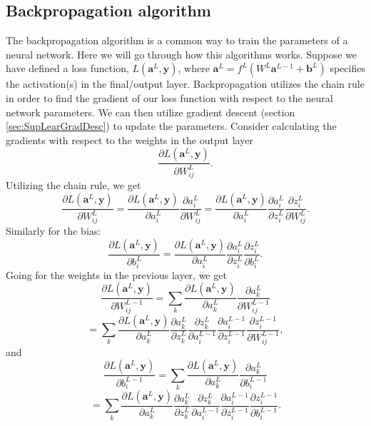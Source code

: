 \subsection{Backpropagation algorithm}
\label{subsec:BackPropagation}

The backpropagation algorithm \cite{backprop} is a common way to train the parameters of a neural network. Here we will go through how this algorithms works. Suppose we have defined a loss function, $L(\boldsymbol{a}^L,\boldsymbol{y})$, where $\boldsymbol{a}^L=f^L(W^L \boldsymbol{a}^{L-1} + \boldsymbol{b}^L)$ specifies the activation(s) in the final/output layer. Backpropagation utilizes the chain rule in order to find the gradient of our loss function with respect to the neural network parameters. We can then utilize gradient descent (section \ref{sec:SupLearGradDesc}) to update the parameters. Consider calculating the gradients with respect to the weights in the output layer
$$ 
\frac{\partial L(\boldsymbol{a}^L,\boldsymbol{y})}{\partial W^{L}_{ij}}.
$$
Utilizing the chain rule, we get
$$ 
\frac{\partial L(\boldsymbol{a}^L,\boldsymbol{y})}{\partial W^{L}_{ij}} = \frac{\partial L(\boldsymbol{a}^L,\boldsymbol{y})}{\partial a^L_i}\frac{\partial a_i^L }{\partial W^{L}_{ij}} = \frac{\partial L(\boldsymbol{a}^L,\boldsymbol{y})}{\partial a^L_i}\frac{\partial a^L_i}{\partial z^L_i}\frac{\partial z_i^L}{\partial W^L_{ij}}.
$$
Similarly for the bias:
$$
\frac{\partial L(\boldsymbol{a}^L,\boldsymbol{y})}{\partial b^L_i}  = \frac{\partial L(\boldsymbol{a}^L,\boldsymbol{y})}{\partial a^L_i}\frac{\partial a^L_i}{\partial z^L_i}\frac{\partial z_i^L}{\partial b^L_{i}}.
$$
Going for the weights in the previous layer, we get
$$ 
\frac{\partial L(\boldsymbol{a}^L,\boldsymbol{y})}{\partial W^{L-1}_{ij}} = \sum_k\frac{\partial L(\boldsymbol{a}^L,\boldsymbol{y})}{\partial a^L_k}\frac{\partial a_k^L }{\partial W^{L-1}_{ij}} 
$$
$$
= \sum_k \frac{\partial L(\boldsymbol{a}^L,\boldsymbol{y})}{\partial a^L_k}\frac{\partial a^L_k}{\partial z^L_k}\frac{\partial z_k^L}{\partial a^{L-1}_{i}}\frac{\partial a^{L-1}_i}{\partial z^{L-1}_i}\frac{\partial z_i^{L-1}}{\partial W^{L-1}_{ij}},
$$
and 
$$ 
\frac{\partial L(\boldsymbol{a}^L,\boldsymbol{y})}{\partial b^{L-1}_{i}} = \sum_k\frac{\partial L(\boldsymbol{a}^L,\boldsymbol{y})}{\partial a^L_k}\frac{\partial a_k^L }{\partial b^{L-1}_{i}} 
$$
$$
= \sum_k \frac{\partial L(\boldsymbol{a}^L,\boldsymbol{y})}{\partial a^L_k}\frac{\partial a^L_k}{\partial z^L_k}\frac{\partial z_k^L}{\partial a^{L-1}_{i}}\frac{\partial a^{L-1}_i}{\partial z^{L-1}_i}\frac{\partial z_i^{L-1}}{\partial b^{L-1}_{i}}.
$$
